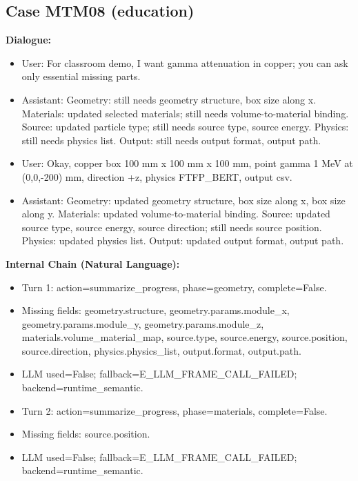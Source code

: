 \documentclass[11pt]{ctexart}
\begin{document}
\subsection{Case MTM08 (education)}
\textbf{Dialogue:}
\begin{itemize}
\item User: For classroom demo, I want gamma attenuation in copper; you can ask only essential missing parts.
\item Assistant: Geometry: still needs geometry structure, box size along x. Materials: updated selected materials; still needs volume-to-material binding. Source: updated particle type; still needs source type, source energy. Physics: still needs physics list. Output: still needs output format, output path.
\item User: Okay, copper box 100 mm x 100 mm x 100 mm, point gamma 1 MeV at (0,0,-200) mm, direction +z, physics FTFP\_BERT, output csv.
\item Assistant: Geometry: updated geometry structure, box size along x, box size along y. Materials: updated volume-to-material binding. Source: updated source type, source energy, source direction; still needs source position. Physics: updated physics list. Output: updated output format, output path.
\end{itemize}
\textbf{Internal Chain (Natural Language):}
\begin{itemize}
\item Turn 1: action=summarize\_progress, phase=geometry, complete=False.
\item Missing fields: geometry.structure, geometry.params.module\_x, geometry.params.module\_y, geometry.params.module\_z, materials.volume\_material\_map, source.type, source.energy, source.position, source.direction, physics.physics\_list, output.format, output.path.
\item LLM used=False; fallback=E\_LLM\_FRAME\_CALL\_FAILED; backend=runtime\_semantic.
\item Turn 2: action=summarize\_progress, phase=materials, complete=False.
\item Missing fields: source.position.
\item LLM used=False; fallback=E\_LLM\_FRAME\_CALL\_FAILED; backend=runtime\_semantic.
\end{itemize}
\end{document}
